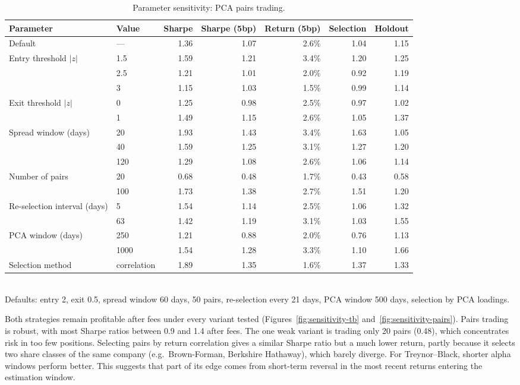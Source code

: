 \documentclass[12pt,letterpaper]{article}
\begin{document}
\begin{table}[H]
\centering
\caption{Parameter sensitivity: PCA pairs trading.}
\label{tab:sensitivity-pairs}
\begin{tabular}{llrrrrr}
\toprule
Parameter & Value & Sharpe & Sharpe (5bp) & Return (5bp) & Selection & Holdout \\
\midrule
Default & --- & 1.36 & 1.07 & 2.6\% & 1.04 & 1.15 \\
Entry threshold $|z|$ & 1.5 & 1.59 & 1.21 & 3.4\% & 1.20 & 1.25 \\
& 2.5 & 1.21 & 1.01 & 2.0\% & 0.92 & 1.19 \\
& 3 & 1.15 & 1.03 & 1.5\% & 0.99 & 1.14 \\
Exit threshold $|z|$ & 0 & 1.25 & 0.98 & 2.5\% & 0.97 & 1.02 \\
& 1 & 1.49 & 1.15 & 2.6\% & 1.05 & 1.37 \\
Spread window (days) & 20 & 1.93 & 1.43 & 3.4\% & 1.63 & 1.05 \\
& 40 & 1.59 & 1.25 & 3.1\% & 1.27 & 1.20 \\
& 120 & 1.29 & 1.08 & 2.6\% & 1.06 & 1.14 \\
Number of pairs & 20 & 0.68 & 0.48 & 1.7\% & 0.43 & 0.58 \\
& 100 & 1.73 & 1.38 & 2.7\% & 1.51 & 1.20 \\
Re-selection interval (days) & 5 & 1.54 & 1.14 & 2.5\% & 1.06 & 1.32 \\
& 63 & 1.42 & 1.19 & 3.1\% & 1.03 & 1.55 \\
PCA window (days) & 250 & 1.21 & 0.88 & 2.0\% & 0.76 & 1.13 \\
& 1000 & 1.54 & 1.28 & 3.3\% & 1.10 & 1.66 \\
Selection method & correlation & 1.89 & 1.35 & 1.6\% & 1.37 & 1.33 \\
\bottomrule
\end{tabular}
\\[4pt]
\small Defaults: entry 2, exit 0.5, spread window 60 days, 50 pairs, re-selection every 21 days, PCA window 500 days, selection by PCA loadings.
\end{table}

Both strategies remain profitable after fees under every variant tested (Figures~\ref{fig:sensitivity-tb} and~\ref{fig:sensitivity-pairs}). Pairs trading is robust, with most Sharpe ratios between 0.9 and 1.4 after fees. The one weak variant is trading only 20 pairs (0.48), which concentrates risk in too few positions. Selecting pairs by return correlation gives a similar Sharpe ratio but a much lower return, partly because it selects two share classes of the same company (e.g.\ Brown-Forman, Berkshire Hathaway), which barely diverge. For Treynor--Black, shorter alpha windows perform better. This suggests that part of its edge comes from short-term reversal in the most recent returns entering the estimation window.
\end{document}
